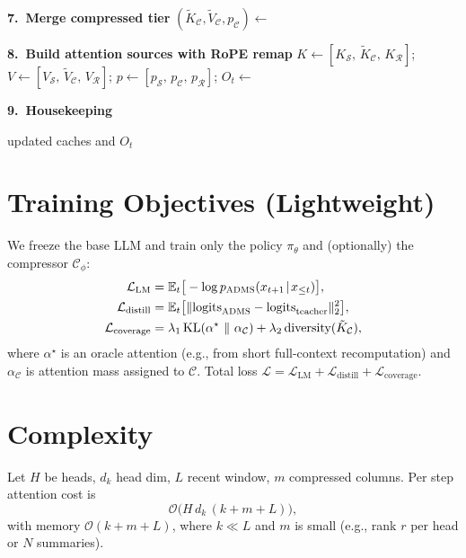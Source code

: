 \documentclass[11pt]{article}
\newcommand{\model}{\textsc{ADMS}} %
\newcommand{\sink}{\mathcal{S}}
\newcommand{\recent}{\mathcal{R}}
\newcommand{\compressed}{\mathcal{C}}
\begin{document}
\begin{algorithm}[H]
\textbf{7.~Merge compressed tier}\;
$(\tilde K_{\compressed}, \tilde V_{\compressed}, p_{\compressed}) \leftarrow$ \MergeCompressed{$\tilde K_{\compressed}, \tilde V_{\compressed}, p_{\compressed},\, \Delta \tilde K, \Delta \tilde V, p_{\Delta}$}\;

\textbf{8.~Build attention sources with RoPE remap}\;
$K \leftarrow [K_{\sink},\, \tilde K_{\compressed},\, K_{\recent}]$;\quad
$V \leftarrow [V_{\sink},\, \tilde V_{\compressed},\, V_{\recent}]$;\quad
$p \leftarrow [p_{\sink},\, p_{\compressed},\, p_{\recent}]$;\;
$O_t \leftarrow$  

\textbf{9.~Housekeeping}\;
\Housekeeping{$\compressed$} 

\Return updated caches and $O_t$\;
\end{algorithm}

\section{Training Objectives (Lightweight)}
We freeze the base LLM and train only the policy $\pi_\theta$ and (optionally) the compressor $\mathcal{C}_\phi$:
\begin{align}
\mathcal{L}_\text{LM} &= \mathbb{E}_{t}\big[-\log p_\text{\model}(x_{t+1}\!\mid\!x_{\le t})\big],\\
\mathcal{L}_\text{distill} &= \mathbb{E}_{t}\big[\|\mathrm{logits}_\text{\model}-\mathrm{logits}_\text{teacher}\|_2^2\big],\\
\mathcal{L}_\text{coverage} &= \lambda_1\, \mathrm{KL}\!\left(\alpha^\star\ \|\ \alpha_{\compressed}\right)+\lambda_2\, \text{diversity}(\tilde K_{\compressed}),
\end{align}
where $\alpha^\star$ is an oracle attention (e.g., from short full-context recomputation) and $\alpha_{\compressed}$ is attention mass assigned to $\compressed$. Total loss $\mathcal{L} = \mathcal{L}_\text{LM}+\mathcal{L}_\text{distill}+\mathcal{L}_\text{coverage}$.

\section{Complexity}
Let $H$ be heads, $d_k$ head dim, $L$ recent window, $m$ compressed columns. Per step attention cost is
\[
\mathcal{O}\big(H\, d_k \,(k + m + L)\big),
\]
with memory $\mathcal{O}(k + m + L)$, where $k\!\ll\!L$ and $m$ is small (e.g., rank $r$ per head or $N$ summaries).
\end{document}
